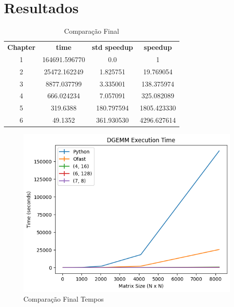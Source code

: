 \documentclass[12pt]{article}
\begin{document}
\newpage
\newpage

\section{Resultados}

\begin{table}[h]
    \centering
    \label{tab:final}
    \begin{tabular}{cccc}
        \textbf{Chapter} & \textbf{time} & \textbf{std speedup} & \textbf{speedup} \\
        1 & 164691.596770 & 0.0 & 1 \\
        2 & 25472.162249	 & 1.825751 &	19.769054 \\
        3 & 8877.037799 & 3.335001 &	138.375974 \\
        4 & 666.024234	 & 	7.057091	& 325.082089 \\
        5 & 319.6388	 & 	180.797594 &	1805.423330 \\
        6 & 49.1352	 & 	361.930530	& 4296.627614 \\
    \end{tabular}
    \caption{Comparação Final}
\end{table}

\begin{figure}[h]
    \centering
    \includegraphics[scale=0.6]{figures/all_times_sizes.png}
    \caption{Comparação Final Tempos}
    \label{fig:times-finall}
\end{figure}
\end{document}
